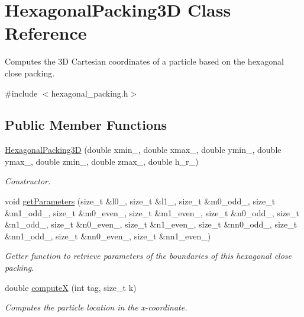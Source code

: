 \hypertarget{classHexagonalPacking3D}{\section{Hexagonal\-Packing3\-D Class Reference}
\label{classHexagonalPacking3D}
}


Computes the 3\-D Cartesian coordinates of a particle based on the hexagonal close packing.  




{\ttfamily \#include $<$hexagonal\-\_\-packing.\-h$>$}

\subsection*{Public Member Functions}
\begin{DoxyCompactItemize}
\item 
\hyperlink{classHexagonalPacking3D_a1ae1184b1166e0952c2de08bf44547f8}{Hexagonal\-Packing3\-D} (double xmin\-\_\-, double xmax\-\_\-, double ymin\-\_\-, double ymax\-\_\-, double zmin\-\_\-, double zmax\-\_\-, double h\-\_\-r\-\_\-)
\begin{DoxyCompactList}\small\item\em Constructor. \end{DoxyCompactList}\item 
void \hyperlink{classHexagonalPacking3D_a9a631bd408edf720655f49d6ad7aaf61}{get\-Parameters} (size\-\_\-t \&l0\-\_\-, size\-\_\-t \&l1\-\_\-, size\-\_\-t \&m0\-\_\-odd\-\_\-, size\-\_\-t \&m1\-\_\-odd\-\_\-, size\-\_\-t \&m0\-\_\-even\-\_\-, size\-\_\-t \&m1\-\_\-even\-\_\-, size\-\_\-t \&n0\-\_\-odd\-\_\-, size\-\_\-t \&n1\-\_\-odd\-\_\-, size\-\_\-t \&n0\-\_\-even\-\_\-, size\-\_\-t \&n1\-\_\-even\-\_\-, size\-\_\-t \&nn0\-\_\-odd\-\_\-, size\-\_\-t \&nn1\-\_\-odd\-\_\-, size\-\_\-t \&nn0\-\_\-even\-\_\-, size\-\_\-t \&nn1\-\_\-even\-\_\-)
\begin{DoxyCompactList}\small\item\em Getter function to retrieve parameters of the boundaries of this hexagonal close packing. \end{DoxyCompactList}\item 
double \hyperlink{classHexagonalPacking3D_ade5a65928e4c898a73eacd872d59f31c}{compute\-X} (int tag, size\-\_\-t k)
\begin{DoxyCompactList}\small\item\em Computes the particle location in the x-\/coordinate. \end{DoxyCompactList}\item 

\end{DoxyCompactItemize}
